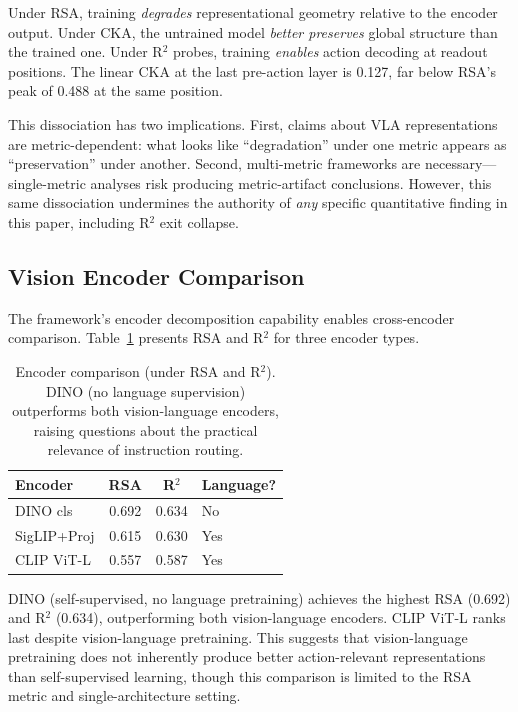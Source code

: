 \documentclass[letterpaper]{article}
\begin{document}
Under RSA, training \emph{degrades} representational geometry relative to the encoder output.
Under CKA, the untrained model \emph{better preserves} global structure than the trained one.
Under R$^2$ probes, training \emph{enables} action decoding at readout positions.
The linear CKA at the last pre-action layer is 0.127, far below RSA's peak of 0.488 at the same position.

This dissociation has two implications.
First, claims about VLA representations are metric-dependent: what looks like ``degradation'' under one metric appears as ``preservation'' under another.
Second, multi-metric frameworks are necessary---single-metric analyses risk producing metric-artifact conclusions.
However, this same dissociation undermines the authority of \emph{any} specific quantitative finding in this paper, including R$^2$ exit collapse.

\subsection{Vision Encoder Comparison}
\label{sec:encodercomp}

The framework's encoder decomposition capability enables cross-encoder comparison.
Table~\ref{tab:encoder} presents RSA and R$^2$ for three encoder types.

\begin{table}[t]
\centering
\caption{Encoder comparison (under RSA and R$^2$). DINO (no language supervision) outperforms both vision-language encoders, raising questions about the practical relevance of instruction routing.}
\label{tab:encoder}
\small
\begin{tabular}{lccl}
\toprule
\textbf{Encoder} & \textbf{RSA} & \textbf{R$^2$} & \textbf{Language?} \\
\midrule
DINO cls & 0.692 & 0.634 & No \\
SigLIP+Proj & 0.615 & 0.630 & Yes \\
CLIP ViT-L & 0.557 & 0.587 & Yes \\
\bottomrule
\end{tabular}
\end{table}

DINO (self-supervised, no language pretraining) achieves the highest RSA (0.692) and R$^2$ (0.634), outperforming both vision-language encoders.
CLIP ViT-L ranks last despite vision-language pretraining.
This suggests that vision-language pretraining does not inherently produce better action-relevant representations than self-supervised learning, though this comparison is limited to the RSA metric and single-architecture setting.
\end{document}
